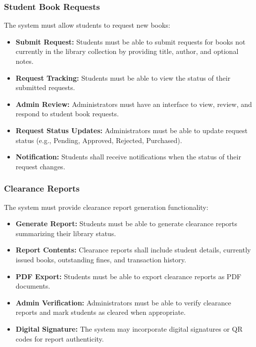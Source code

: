 \documentclass[12pt,a4paper]{report}
\begin{document}
\subsubsection{Student Book Requests}

The system must allow students to request new books:

\begin{itemize}
    \item \textbf{Submit Request:} Students must be able to submit requests for books not currently in the library collection by providing title, author, and optional notes.
    
    \item \textbf{Request Tracking:} Students must be able to view the status of their submitted requests.
    
    \item \textbf{Admin Review:} Administrators must have an interface to view, review, and respond to student book requests.
    
    \item \textbf{Request Status Updates:} Administrators must be able to update request status (e.g., Pending, Approved, Rejected, Purchased).
    
    \item \textbf{Notification:} Students shall receive notifications when the status of their request changes.
\end{itemize}

\subsubsection{Clearance Reports}

The system must provide clearance report generation functionality:

\begin{itemize}
    \item \textbf{Generate Report:} Students must be able to generate clearance reports summarizing their library status.
    
    \item \textbf{Report Contents:} Clearance reports shall include student details, currently issued books, outstanding fines, and transaction history.
    
    \item \textbf{PDF Export:} Students must be able to export clearance reports as PDF documents.
    
    \item \textbf{Admin Verification:} Administrators must be able to verify clearance reports and mark students as cleared when appropriate.
    
    \item \textbf{Digital Signature:} The system may incorporate digital signatures or QR codes for report authenticity.
\end{itemize}
\end{document}
